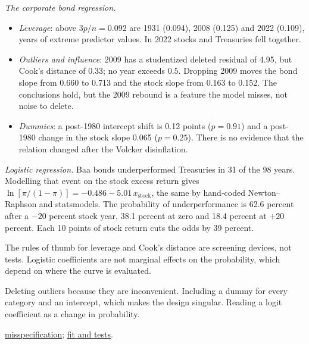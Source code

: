 \begin{qfmethod}
 \emph{The corporate bond regression.}
\begin{itemize}
\item \emph{Leverage}: above $3p/n=0.092$ are 1931 (0.094), 2008 (0.125) and 2022 (0.109), years of extreme predictor values. In 2022 stocks and Treasuries fell together.
\item \emph{Outliers and influence}: 2009 has a studentized deleted residual of 4.95, but Cook's distance of 0.33; no year exceeds 0.5. Dropping 2009 moves the bond slope from 0.660 to 0.713 and the stock slope from 0.163 to 0.152. The conclusions hold, but the 2009 rebound is a feature the model misses, not noise to delete.
\item \emph{Dummies}: a post-1980 intercept shift is 0.12 points ($p=0.91$) and a post-1980 change in the stock slope 0.065 ($p=0.25$). There is no evidence that the relation changed after the Volcker disinflation.
\end{itemize}

\emph{Logistic regression.} Baa bonds underperformed Treasuries in 31 of the 98 years. Modelling that event on the stock excess return gives $\ln[\pi/(1-\pi)]=-0.486-5.01\,x_{\text{stock}}$, the same by hand-coded Newton--Raphson and statsmodels. The probability of underperformance is 62.6 percent after a $-20$ percent stock year, 38.1 percent at zero and 18.4 percent at $+20$ percent. Each 10 points of stock return cuts the odds by 39 percent.

 The rules of thumb for leverage and Cook's distance are screening devices, not tests. Logistic coefficients are not marginal effects on the probability, which depend on where the curve is evaluated.

 Deleting outliers because they are inconvenient. Including a dummy for every category and an intercept, which makes the design singular. Reading a logit coefficient as a change in probability.

 \hyperref[meth:regression-misspecification]{misspecification}; \hyperref[meth:multiple-regression-fit-tests]{fit and tests}.

\end{qfmethod}
